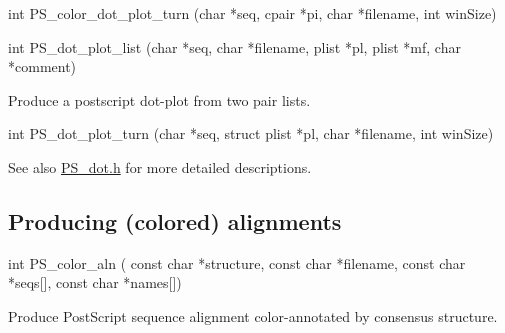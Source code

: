 \begin{DoxyVerb}int PS_color_dot_plot_turn (char *seq,
                            cpair *pi,
                            char *filename,
                            int winSize)
\end{DoxyVerb}


\begin{DoxyVerb}int PS_dot_plot_list (char *seq,
                      char *filename,
                      plist *pl,
                      plist *mf,
                      char *comment)
\end{DoxyVerb}
 Produce a postscript dot-\/plot from two pair lists.

\begin{DoxyVerb}int PS_dot_plot_turn (char *seq,
                      struct plist *pl,
                      char *filename,
                      int winSize)
\end{DoxyVerb}


\begin{DoxySeeAlso}{See also}
\mbox{\hyperlink{PS__dot_8h}{P\+S\+\_\+dot.\+h}} for more detailed descriptions.
\end{DoxySeeAlso}
\hypertarget{plots_utils_aln}{}\subsection{Producing (colored) alignments}\label{plots_utils_aln}
\begin{DoxyVerb}int PS_color_aln (
            const char *structure,
            const char *filename,
            const char *seqs[],
            const char *names[])
\end{DoxyVerb}
 Produce Post\+Script sequence alignment color-\/annotated by consensus structure. 